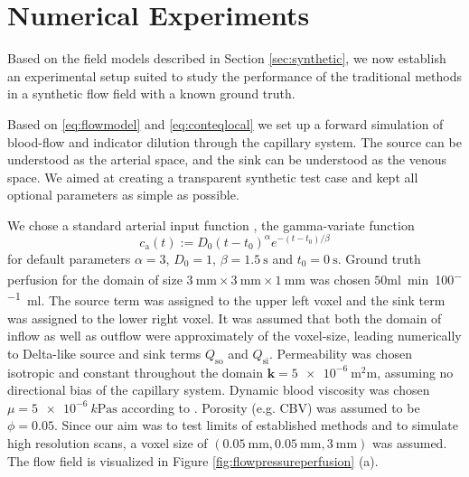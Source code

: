 \documentclass[journal,twocolumn]{IEEEtran}
\newcommand{\Qso}{Q_{\mathrm{so}}}
\newcommand{\Qsi}{Q_{\mathrm{si}}}
\newcommand{\ca}{c_\mathrm{a}}
\newcommand{\simu}{k\pascal\second}
\newcommand{\siFmm}{\milli\meter\cubed\per\second}
\newcommand{\siPml}{\milli\litre\per\minute\per100\milli\litre}
\begin{document}
	
	\section{Numerical Experiments}\label{sec:NumExp}
Based on the field models described in Section \ref{sec:synthetic}, we now establish an experimental setup suited to study the performance of the traditional methods in a synthetic flow field with a known ground truth.

	Based on \eqref{eq:flowmodel} and \eqref{eq:conteqlocal} we set up a forward simulation of blood-flow and indicator dilution through the capillary system. The source can be understood as the arterial space, and the sink can be understood as the venous space. We aimed at creating a transparent synthetic test case and kept all optional parameters as simple as possible. 
	
	We chose a standard arterial input function \cite{ostergaard96}, the gamma-variate function
	\begin{equation}
		\ca(t) := D_0(t-t_0)^\alpha e^{-(t-t_0)/\beta}
	\end{equation}
	for default parameters $\alpha=3$, $D_0 = 1$, $\beta = \SI{1.5}{\second}$ and $t_0 = \SI{0}{\second}$.
	Ground truth perfusion for the domain of size $\SI{3}{\milli\meter}\times\SI{3}{\milli\meter}\times\SI{1}{\milli\meter}$ was chosen $50$\si{\siPml}.
	The source term was assigned to the upper left voxel and the sink term was assigned to the lower right voxel.
	It was assumed that both the domain of inflow as well as outflow were approximately of the voxel-size, leading numerically to Delta-like source and sink terms $\Qso$ and $\Qsi$.
	Permeability was chosen isotropic and constant throughout the domain $\mathbf{k}=\SI{5e-6}{\square\milli\meter}$, assuming no directional bias of the capillary system.
	Dynamic blood viscosity was chosen $\mu=\SI{5e-6}{\simu}$ according to \cite{rosencranz06}.
	Porosity (e.g. CBV) was assumed to be $\phi = 0.05$.
	Since our aim was to test limits of established methods and to simulate high resolution scans, a voxel size of $(\SI{0.05}{\milli\meter},\SI{0.05}{\milli\meter},\SI{3}{\milli\meter})$ was assumed.
	The flow field is visualized in Figure \ref{fig:flowpressureperfusion} (a).
	
\end{document}
